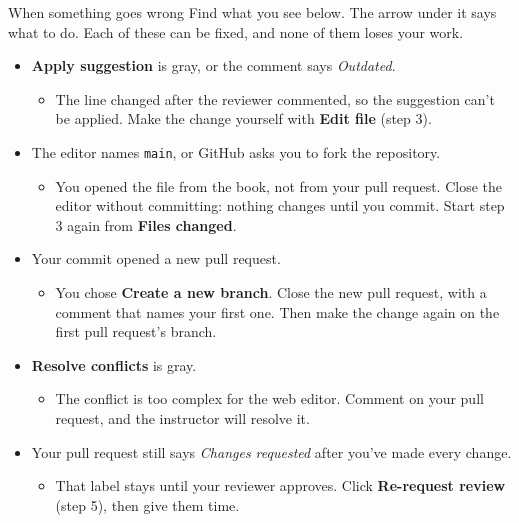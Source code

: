\documentclass{handout}
\begin{document}
\begin{frame}{When something goes wrong}
  Find what you see below. The arrow under it says what to do. Each of
  these can be fixed, and none of them loses your work.
  \begin{itemize}[itemsep=5pt,topsep=4pt]
    \item \textbf{Apply suggestion} is gray, or the comment says
      \textit{Outdated}.
      \begin{itemize}[label=$\rightarrow$,topsep=1pt]
        \item The line changed after the reviewer commented, so the
          suggestion can't be applied. Make the change yourself with
          \textbf{Edit file} (step 3).
      \end{itemize}
    \item The editor names \texttt{main}, or GitHub asks you to fork the
      repository.
      \begin{itemize}[label=$\rightarrow$,topsep=1pt]
        \item You opened the file from the book, not from your pull
          request. Close the editor without committing: nothing changes
          until you commit. Start step 3 again from \textbf{Files changed}.
      \end{itemize}
    \item Your commit opened a new pull request.
      \begin{itemize}[label=$\rightarrow$,topsep=1pt]
        \item You chose \textbf{Create a new branch}. Close the new pull
          request, with a comment that names your first one. Then make the
          change again on the first pull request's branch.
      \end{itemize}
    \item \textbf{Resolve conflicts} is gray.
      \begin{itemize}[label=$\rightarrow$,topsep=1pt]
        \item The conflict is too complex for the web editor. Comment on
          your pull request, and the instructor will resolve it.
      \end{itemize}
    \item Your pull request still says \textit{Changes requested} after
      you've made every change.
      \begin{itemize}[label=$\rightarrow$,topsep=1pt]
        \item That label stays until your reviewer approves. Click
          \textbf{Re-request review} (step 5), then give them time.

\end{itemize}
\end{itemize}
\end{frame}
\end{document}
